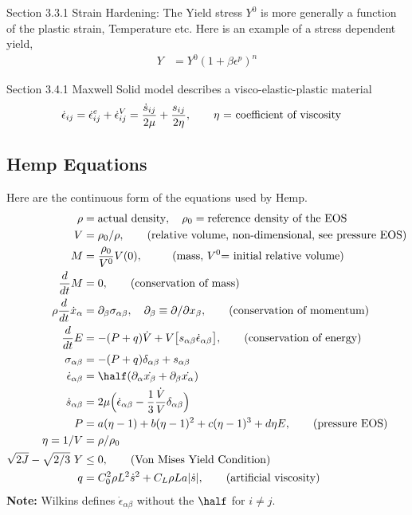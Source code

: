 Section 3.3.1 Strain Hardening: The Yield stress $Y^0$ is more generally a function of the plastic strain,
Temperature etc. Here is an example of a stress dependent yield, 
\begin{align*}
  Y &= Y^0( 1 + \beta \epsilon^p)^n 
\end{align*}

Section 3.4.1 Maxwell Solid model describes a visco-elastic-plastic material
\begin{align*}
  \dot{\epsilon}_{ij} &= \dot{\epsilon}^e_{ij} + \dot{\epsilon}^V_{ij} = 
        {\dot{s}_{ij}\over 2\mu} + {s_{ij}\over 2\eta}, \qquad\text{$\eta$ = coefficient of viscosity}
\end{align*}


\clearpage
\subsection{Hemp Equations}
Here are the continuous form of the equations used by Hemp. 
\begin{align}
  \rho&=\text{actual density}, \quad \rho_0=\text{reference density of the EOS} \\
  V &= \rho_0/\rho , \qquad\text{(relative volume, non-dimensional, see pressure EOS)} \\
  M &= {\rho_0 \over V^0} V(0) ,~~  \qquad\text{(mass, $V^0$= initial relative volume)} \\
  {d\over dt} M &= 0 , \qquad\text{(conservation of mass)} \\
  \rho {d\over dt} \dot{x}_\alpha &= {\partial_\beta} \sigma_{\alpha\beta}, 
         \quad {\partial_\beta}\equiv{\partial/\partial x_\beta},      \qquad\text{(conservation of momentum)} \\
  {d\over dt} E &= -(P+q) \dot{V} + V \big[ s_{\alpha\beta} \dot{\epsilon}_{\alpha\beta} \big] , 
                                            \qquad\text{(conservation of energy)}  \\
  \sigma_{\alpha\beta} &= -(P+q)\delta_{\alpha\beta} + s_{\alpha\beta} \\
  \dot{\epsilon}_{\alpha\beta} &= \half( \partial_\alpha \dot{x_\beta} + \partial_\beta \dot{x_\alpha}) \\
  \dot{s}_{\alpha\beta} &= 2\mu \Big(\dot{\epsilon}_{\alpha\beta} - \frac{1}{3}{\dot{V} \over V}\delta_{\alpha\beta} \Big) \\
  P &= a(\eta-1) + b(\eta-1)^2 + c(\eta-1)^3 + d \eta E,  \qquad\text{(pressure EOS)} \\
  \eta=1/V &= \rho/\rho_0  \\
  \sqrt{ 2 J} - \sqrt{2/3} ~Y &\le 0 , \qquad\text{(Von Mises Yield Condition)} \\
   q &= C_0^2 \rho L^2 \dot{s}^2 + C_L \rho L a \vert \dot{s} \vert , \qquad\text{(artificial viscosity)} 
\end{align}
{\bf Note:} Wilkins defines $\dot{\epsilon}_{\alpha\beta}$ without the $\half$ for $i\ne j$. 

